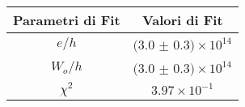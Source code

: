 \begin{tabular}{cc}
\hline
	Parametri di Fit & Valori di Fit\\ 
\hline
	$e/h$ & $(3.0$ $\pm$ $0.3)\times 10^{14}$ \\
	$W_o/h$ & $(3.0$ $\pm$ $0.3)\times 10^{14}$ \\
	$\chi^2$ & $3.97\times 10^{-1}$ \\
\hline
\end{tabular}
